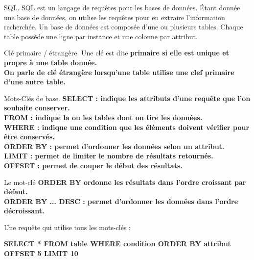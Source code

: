\documentclass[french, 11pt]{article}
\begin{document}


\begin{defi}{SQL.}{}
    SQL est un langage de requêtes pour les bases de données. Étant donnée une base de données, on utilise les requêtes pour en extraire l'information recherchée. Un base de données est composée d'une ou plusieurs tables. Chaque table possède une ligne par instance et une colonne par attribut.
\end{defi}

\vspace*{-0.7cm}

\begin{defi}{Clé primaire / étrangère.}{}
    Une clé est dite \bf{primaire} si elle est unique et propre à une table donnée.\\
    On parle de clé \bf{étrangère} lorsqu'une table utilise une clef primaire d'une autre table.
\end{defi}

\vspace*{-0.7cm}

\begin{defi}{Mots-Clés de base.}{}
    \bf{SELECT} : indique les attributs d'une requête que l'on souhaite conserver.\\
    \bf{FROM} : indique la ou les tables dont on tire les données.\\
    \bf{WHERE} : indique une condition que les éléments doivent vérifier pour être conservés.\\
    \bf{ORDER BY} : permet d'ordonner les données selon un attribut.\\
    \bf{LIMIT} : permet de limiter le nombre de résultats retournés.\\
    \bf{OFFSET} : permet de couper le début des résultats.
\end{defi}

\vspace*{-0.7cm}

\begin{defi}{}{}
    Le mot-clé \bf{ORDER BY} ordonne les résultats dans l'ordre croissant par défaut.\\
    \bf{ORDER BY ... DESC} : permet d'ordonner les données dans l'ordre décroissant.
\end{defi}

\vspace*{-0.7cm}

\begin{ex}{}{}
    Une requête qui utilise tous les mots-clés :
    \begin{center}
        \bf{SELECT} * \bf{FROM} table \bf{WHERE} condition \bf{ORDER BY} attribut \bf{OFFSET} 5 \bf{LIMIT} 10
    \end{center}
\end{ex}
\end{document}
